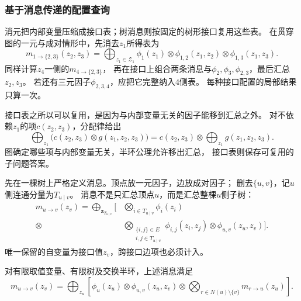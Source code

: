 \subsubsection{基于消息传递的配置查询}

消元把内部变量压缩成接口表；树消息则按固定的树形接口复用这些表。
在贯穿图的一元与成对情形中，先消去\(z_1\)所得表为
\begin{equation}
  m_{1\to\{2,3\}}(z_2,z_3)=
  \bigoplus_{z_1\in\mathcal Z_1}
  \phi_1(z_1)\otimes\phi_{1,2}(z_1,z_2)\otimes\phi_{1,3}(z_1,z_3).
  \label{eq:graph-theory-interface-message}
\end{equation}
同样计算\(z_4\)一侧的\(m_{4\to\{2,3\}}\)，
再在接口上组合两条消息与\(\phi_2,\phi_3,\phi_{2,3}\)，最后汇总\(z_2,z_3\)。
若还有三元因子\(\phi_{2,3,4}\)，应把它完整纳入\(4\)侧表。
每种接口配置的局部结果只算一次。

接口表之所以可以复用，是因为与内部变量无关的因子能移到汇总之外。
对不依赖\(z_1\)的项\(c(z_2,z_3)\)，分配律给出
\[
  \bigoplus_{z_1}\bigl(c(z_2,z_3)\otimes g(z_1,z_2,z_3)\bigr)
  =c(z_2,z_3)\otimes\bigoplus_{z_1}g(z_1,z_2,z_3).
\]
图确定哪些项与内部变量无关，半环公理允许移出汇总，
接口表则保存可复用的子问题答案。

先在一棵树上严格定义消息。顶点放一元因子，边放成对因子；
删去\(\{u,v\}\)，记\(u\)侧连通分量为\(T_{u\mid v}\)。
消息不是只汇总顶点\(u\)，而是汇总整棵\(u\)侧子树：
\begin{equation}
  \begin{aligned}
    m_{u\to v}(z_v)
    =\bigoplus_{\bm z_{T_{u\mid v}}}
    \biggl[
      &\bigotimes_{i\in T_{u\mid v}}\phi_i(z_i)\\[-2pt]
      {}\otimes&
      \bigotimes_{\substack{\{i,j\}\in E\\i,j\in T_{u\mid v}}}
        \phi_{i,j}(z_i,z_j)
      \otimes\phi_{u,v}(z_u,z_v)
    \biggr].
  \end{aligned}
  \label{eq:graph-theory-tree-message-semantics}
\end{equation}
唯一保留的自变量为接口值\(z_v\)，跨接口边项也必须计入。

\begin{theorem}[树消息递推]
  \label{thm:graph-theory-tree-message-recursion}
  对有限取值变量、有限树及交换半环，上述消息满足
  \begin{equation}
    m_{u\to v}(z_v)=\bigoplus_{z_u}
    \left[
      \phi_u(z_u)\otimes\phi_{u,v}(z_u,z_v)
      \otimes\bigotimes_{r\in N(u)\setminus\{v\}}m_{r\to u}(z_u)
    \right].
    \label{eq:graph-theory-tree-message-recursion}
  \end{equation}
\end{theorem}

